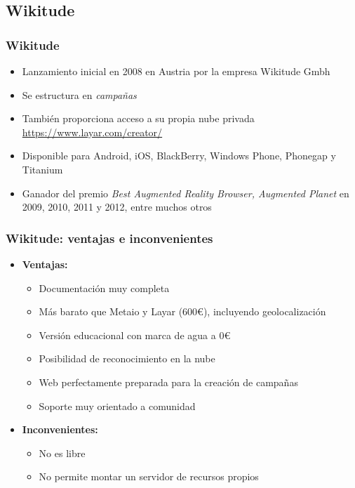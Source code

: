 \subsection*{Wikitude}
\frame
{
\frametitle{Wikitude}
\begin{itemize}
 \item Lanzamiento inicial en 2008 en Austria por la empresa Wikitude Gmbh
 \item Se estructura en \textit{campañas}
 \item También proporciona acceso a su propia nube privada\\
   \url{https://www.layar.com/creator/}
 \item Disponible para Android, iOS, BlackBerry, Windows Phone, Phonegap y Titanium
 \item Ganador del premio \textit{Best Augmented Reality Browser, Augmented Planet} en 2009, 2010, 2011 y 2012, entre muchos otros
\end{itemize}
}

\frame
{
\frametitle{Wikitude: ventajas e inconvenientes}
\begin{itemize}
\item \textbf{Ventajas:}
  \begin{itemize}
   \item Documentación muy completa
   \item Más barato que Metaio y Layar (600\euro), incluyendo geolocalización
   \item Versión educacional con marca de agua a 0\euro
   \item Posibilidad de reconocimiento en la nube
   \item Web perfectamente preparada para la creación de campañas
   \item Soporte muy orientado a comunidad
  \end{itemize}

\item \textbf{Inconvenientes:}
  \begin{itemize}
   \item No es libre
   \item No permite montar un servidor de recursos propios
  \end{itemize}

\end{itemize}
}
